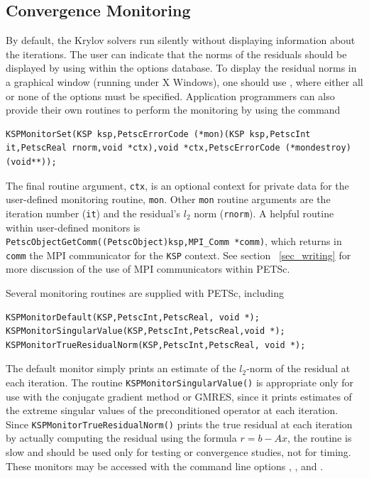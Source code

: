 \subsection{Convergence Monitoring}
\label{sec_kspmonitor}

By default, the Krylov solvers run silently without displaying information
about the iterations. The user can indicate that the norms of the residuals
should be displayed by using 
 within the options database.
To display the residual norms in a graphical window (running under X Windows),
one should use  \trl{[x,y,w,h]}, where either all or none of
the options must be specified. 
Application programmers can also provide their own routines to perform
the monitoring by using the command
\begin{lstlisting}
KSPMonitorSet(KSP ksp,PetscErrorCode (*mon)(KSP ksp,PetscInt it,PetscReal rnorm,void *ctx),void *ctx,PetscErrorCode (*mondestroy)(void**));
\end{lstlisting}
The final routine argument, \lstinline{ctx}, is an optional context for private
data for the user-defined monitoring routine, \lstinline{mon}.  Other
\lstinline{mon} routine arguments are the iteration
number (\lstinline{it}) and the residual's $ l_2 $ norm (\lstinline{rnorm}).
A helpful routine within user-defined monitors is
\break\lstinline{PetscObjectGetComm((PetscObject)ksp,MPI_Comm *comm)}, which returns
in \lstinline{comm}  the
MPI communicator for the \lstinline{KSP} context.  See section ~\ref{sec_writing}
for more discussion of the use of MPI communicators within PETSc.

Several monitoring routines are supplied with PETSc,
including
\begin{lstlisting}
KSPMonitorDefault(KSP,PetscInt,PetscReal, void *);
KSPMonitorSingularValue(KSP,PetscInt,PetscReal,void *);
KSPMonitorTrueResidualNorm(KSP,PetscInt,PetscReal, void *);
\end{lstlisting}
The default monitor simply prints an estimate of the $l_2$-norm of the
residual at each iteration. The routine
\lstinline{KSPMonitorSingularValue()} is appropriate only for use with the conjugate
gradient method or GMRES, since it prints estimates of the extreme singular
values of the preconditioned operator at each iteration. Since
\lstinline{KSPMonitorTrueResidualNorm()} prints
the true residual at each iteration by
actually computing the residual using the formula $ r = b - Ax $, the routine
is slow and should be used only for testing or convergence studies,
not for timing. These monitors may be accessed with the command line options
, , and .
  


